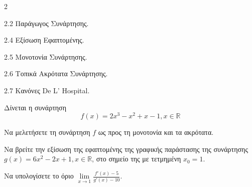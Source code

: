 \begin{ylh}{2}
    \item 2.2 Παράγωγος Συνάρτησης.
    \item 2.4 Εξίσωση Εφαπτομένης.
    \item 2.5 Μονοτονία Συνάρτησης.
    \item 2.6 Τοπικά Ακρότατα Συνάρτησης.
    \item 2.7 Κανόνες De L' Hospital.
\end{ylh}
Δίνεται η συνάρτηση
\[ f(x) = 2x^3 - x^2 + x - 1, x \in \mathbb{R} \]
\begin{alist}
\item Να μελετήσετε τη συνάρτηση $f$ ως προς τη μονοτονία και τα ακρότατα. 
\item Να βρείτε την εξίσωση της εφαπτομένης της γραφικής παράστασης της συνάρτησης $g(x) = 6x^2 - 2x + 1, x \in \mathbb{R}$, στο σημείο της με τετμημένη $x_0 = 1$. 
\item Να υπολογίσετε το όριο $\displaystyle \lim\limits_{x \to 1} \frac{f'(x) - 5}{g'(x) - 10}$. 
\end{alist}

